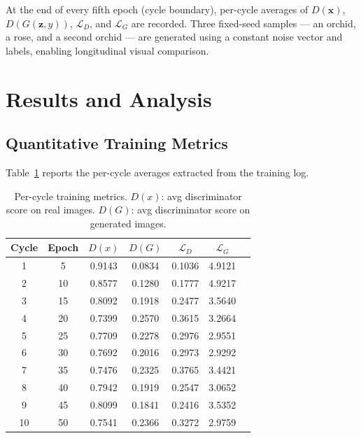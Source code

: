 \documentclass[conference]{IEEEtran}
\begin{document}
At the end of every fifth epoch (cycle boundary), per-cycle averages of $D(\mathbf{x})$, $D(G(\mathbf{z},y))$, $\mathcal{L}_D$, and $\mathcal{L}_G$ are recorded. Three fixed-seed samples --- an orchid, a rose, and a second orchid --- are generated using a constant noise vector and labels, enabling longitudinal visual comparison.

\section{Results and Analysis}
\label{sec:results}

\subsection{Quantitative Training Metrics}
\label{ssec:quant}

Table~\ref{tab:metrics} reports the per-cycle averages extracted from the training log.

\begin{table}[h]
  \centering
  \caption{Per-cycle training metrics. $D(x)$: avg discriminator score on real images. $D(G)$: avg discriminator score on generated images.}
  \label{tab:metrics}
  \begin{tabular}{ccccccc}
    \toprule
    \textbf{Cycle} & \textbf{Epoch} & \textbf{$D(x)$} & \textbf{$D(G)$} & \textbf{$\mathcal{L}_D$} & \textbf{$\mathcal{L}_G$} \\
    \midrule
    1  &  5 & 0.9143 & 0.0834 & 0.1036 & 4.9121 \\
    2  & 10 & 0.8577 & 0.1280 & 0.1777 & 4.9217 \\
    3  & 15 & 0.8092 & 0.1918 & 0.2477 & 3.5640 \\
    4  & 20 & 0.7399 & 0.2570 & 0.3615 & 3.2664 \\
    5  & 25 & 0.7709 & 0.2278 & 0.2976 & 2.9551 \\
    6  & 30 & 0.7692 & 0.2016 & 0.2973 & 2.9292 \\
    7  & 35 & 0.7476 & 0.2325 & 0.3765 & 3.4421 \\
    8  & 40 & 0.7942 & 0.1919 & 0.2547 & 3.0652 \\
    9  & 45 & 0.8099 & 0.1841 & 0.2416 & 3.5352 \\
    10 & 50 & 0.7541 & 0.2366 & 0.3272 & 2.9759 \\
    \bottomrule
  \end{tabular}
\end{table}
\end{document}

